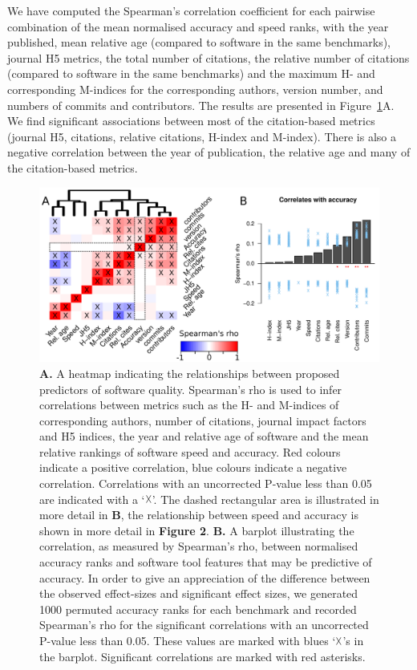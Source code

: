 \documentclass[fleqn,10pt]{SelfArx} %
\begin{document}
We have computed the Spearman’s correlation coefficient for each
pairwise combination of the mean normalised accuracy and speed ranks,
with the year published, mean relative age (compared to software in the
same benchmarks), journal H5 metrics, the total number of citations,
the relative number of citations (compared to software in the same
benchmarks) and the maximum H- and corresponding M-indices for the corresponding
authors, version number, and numbers of commits and contributors.
The results are presented in Figure~\ref{fig:allfactors}A. We find
significant associations between most of the citation-based metrics
(journal H5, citations, relative citations, H-index and
M-index). There is also a negative correlation between the year of
publication, the relative age and many of the citation-based metrics.


\begin{figure}[ht]
\includegraphics[width=\textwidth]{figure1.pdf}
\caption{\textbf{A.} A heatmap indicating the relationships between
  proposed predictors of software quality. Spearman’s rho is used to
  infer correlations between metrics such as the H- and M-indices of
  corresponding authors, number of citations, journal impact factors
  and H5 indices, the year and relative age of software and the mean
  relative rankings of software speed and accuracy. Red colours
  indicate a positive correlation, blue colours indicate a negative
  correlation. Correlations with an uncorrected P-value less than 0.05 are
  indicated with a `$\vartimes$'. The dashed rectangular area is illustrated in
  more detail in \textbf{B}, the relationship between speed and
  accuracy is shown in more detail in \textbf{Figure 2}.
  \textbf{B.} A barplot illustrating the correlation, as measured by
  Spearman’s rho, between normalised accuracy ranks and software tool
  features that may be predictive of accuracy. In order to give an
  appreciation of the difference between the observed effect-sizes and
  significant effect sizes, we generated 1000 permuted accuracy ranks
  for each benchmark and recorded Spearman’s rho for the significant
  correlations with an uncorrected P-value less than 0.05.
  These values are marked with blues `$\vartimes$'s in the
  barplot. Significant correlations are marked with red asterisks.}
\label{fig:allfactors}
\end{figure}
\end{document}
